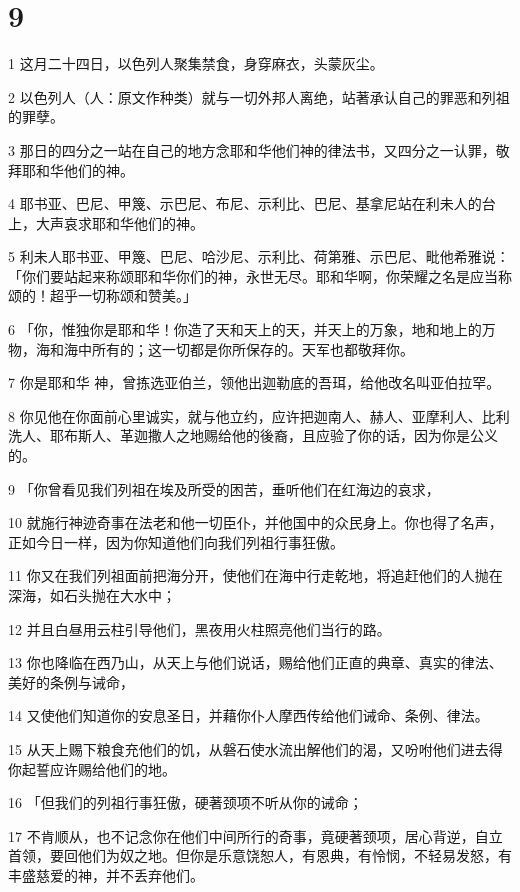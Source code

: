\chapter{9}

\par 1 这月二十四日，以色列人聚集禁食，身穿麻衣，头蒙灰尘。
\par 2 以色列人（人：原文作种类）就与一切外邦人离绝，站著承认自己的罪恶和列祖的罪孽。
\par 3 那日的四分之一站在自己的地方念耶和华他们神的律法书，又四分之一认罪，敬拜耶和华他们的神。
\par 4 耶书亚、巴尼、甲篾、示巴尼、布尼、示利比、巴尼、基拿尼站在利未人的台上，大声哀求耶和华他们的神。
\par 5 利未人耶书亚、甲篾、巴尼、哈沙尼、示利比、荷第雅、示巴尼、毗他希雅说：「你们要站起来称颂耶和华你们的神，永世无尽。耶和华啊，你荣耀之名是应当称颂的！超乎一切称颂和赞美。」
\par 6 「你，惟独你是耶和华！你造了天和天上的天，并天上的万象，地和地上的万物，海和海中所有的；这一切都是你所保存的。天军也都敬拜你。
\par 7 你是耶和华 神，曾拣选亚伯兰，领他出迦勒底的吾珥，给他改名叫亚伯拉罕。
\par 8 你见他在你面前心里诚实，就与他立约，应许把迦南人、赫人、亚摩利人、比利洗人、耶布斯人、革迦撒人之地赐给他的後裔，且应验了你的话，因为你是公义的。
\par 9 「你曾看见我们列祖在埃及所受的困苦，垂听他们在红海边的哀求，
\par 10 就施行神迹奇事在法老和他一切臣仆，并他国中的众民身上。你也得了名声，正如今日一样，因为你知道他们向我们列祖行事狂傲。
\par 11 你又在我们列祖面前把海分开，使他们在海中行走乾地，将追赶他们的人抛在深海，如石头抛在大水中；
\par 12 并且白昼用云柱引导他们，黑夜用火柱照亮他们当行的路。
\par 13 你也降临在西乃山，从天上与他们说话，赐给他们正直的典章、真实的律法、美好的条例与诫命，
\par 14 又使他们知道你的安息圣日，并藉你仆人摩西传给他们诫命、条例、律法。
\par 15 从天上赐下粮食充他们的饥，从磐石使水流出解他们的渴，又吩咐他们进去得你起誓应许赐给他们的地。
\par 16 「但我们的列祖行事狂傲，硬著颈项不听从你的诫命；
\par 17 不肯顺从，也不记念你在他们中间所行的奇事，竟硬著颈项，居心背逆，自立首领，要回他们为奴之地。但你是乐意饶恕人，有恩典，有怜悯，不轻易发怒，有丰盛慈爱的神，并不丢弃他们。
